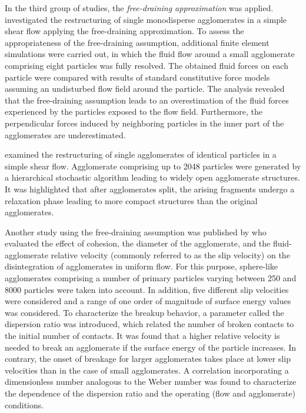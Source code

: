 In the third group of studies, the \emph{free-draining approximation}
was applied.  \citet{becker2009restructuring} investigated the
restructuring of single monodisperse agglomerates in a simple shear
flow applying the free-draining approximation. To assess the
appropriateness of the free-draining assumption, additional finite
element simulations were carried out, in which the fluid flow around a
small agglomerate comprising eight particles was fully resolved.  The
obtained fluid forces on each particle were compared with results of
standard constitutive force models assuming an undisturbed flow field
around the particle. The analysis revealed that the free-draining
assumption leads to an overestimation of the fluid forces experienced
by the particles exposed to the flow field. Furthermore, the
perpendicular forces induced by neighboring particles in the inner
part of the agglomerates are underestimated.

\citet{eggersdorfer2010fragmentation} examined the restructuring of
single agglomerates of identical particles in a simple shear flow.
Agglomerate comprising up to 2048 particles were generated by a
hierarchical stochastic algorithm leading to widely open agglomerate
structures.  It was highlighted that after agglomerates split, the
arising fragments undergo a relaxation phase leading to more compact
structures than the original agglomerates.

  Another study using the
free-draining assumption was published by
\citet{calvert2011mechanistic} who evaluated the effect of cohesion,
the diameter of the agglomerate, and the fluid-agglomerate relative
velocity (commonly referred to as the slip velocity) on the
disintegration of agglomerates in uniform flow. For this purpose,
sphere-like agglomerates comprising a number of primary particles
varying between 250 and 8000 particles were taken into account. In
addition, five different slip velocities were considered and a range
of one order of magnitude of surface energy values was considered. To
characterize the breakup behavior, a parameter called the dispersion
ratio was introduced, which related the number of broken contacts to
the initial number of contacts. It was found that a higher relative
velocity is needed to break an agglomerate if the surface energy of
the particle increases.  In contrary, the onset of breakage for larger
agglomerates takes place at lower slip velocities than in the case of
small agglomerates. A correlation incorporating a dimensionless number
analogous to the Weber number was found to characterize the dependence
of the dispersion ratio and the operating (flow and agglomerate)
conditions.

